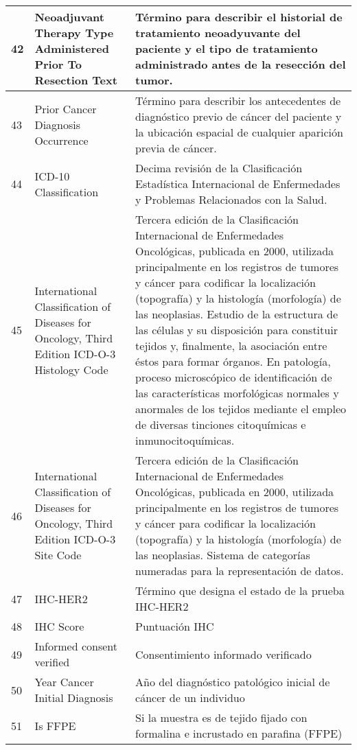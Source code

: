 \begin{table*} [!htb]
\begin{threeparttable}
\begin{tabular}{p{1cm} p{4cm} p{10cm}}
			\\ \hline	42	&	Neoadjuvant Therapy Type Administered Prior To Resection Text	&	Término para describir el historial de tratamiento neoadyuvante del paciente y el tipo de tratamiento administrado antes de la resección del tumor.
			\\ \hline	43	&	Prior Cancer Diagnosis Occurrence	&	Término para describir los antecedentes de diagnóstico previo de cáncer del paciente y la ubicación espacial de cualquier aparición previa de cáncer.
			\\ \hline	44	&	ICD-10 Classification	&	Decima revisión de la Clasificación Estadística Internacional de Enfermedades y Problemas Relacionados con la Salud.
			\\ \hline	45	&	International Classification of Diseases for Oncology, Third Edition ICD-O-3 Histology Code	&	Tercera edición de la Clasificación Internacional de Enfermedades Oncológicas, publicada en 2000, utilizada principalmente en los registros de tumores y cáncer para codificar la localización (topografía) y la histología (morfología) de las neoplasias. Estudio de la estructura de las células y su disposición para constituir tejidos y, finalmente, la asociación entre éstos para formar órganos. En patología, proceso microscópico de identificación de las características morfológicas normales y anormales de los tejidos mediante el empleo de diversas tinciones citoquímicas e inmunocitoquímicas.
			\\ \hline	46	&	International Classification of Diseases for Oncology, Third Edition ICD-O-3 Site Code	&	Tercera edición de la Clasificación Internacional de Enfermedades Oncológicas, publicada en 2000, utilizada principalmente en los registros de tumores y cáncer para codificar la localización (topografía) y la histología (morfología) de las neoplasias. Sistema de categorías numeradas para la representación de datos.
			\\ \hline	47	&	IHC-HER2	&	Término que designa el estado de la prueba IHC-HER2
			\\ \hline	48	&	IHC Score	&	Puntuación IHC
			\\ \hline	49	&	Informed consent verified	&	Consentimiento informado verificado
			\\ \hline	50	&	Year Cancer Initial Diagnosis	&	Año del diagnóstico patológico inicial de cáncer de un individuo
			\\ \hline	51	&	Is FFPE	&	Si la muestra es de tejido fijado con formalina e incrustado en parafina (FFPE)
			\\ \hline
		\end{tabular}
	\end{threeparttable}
\end{table*}

